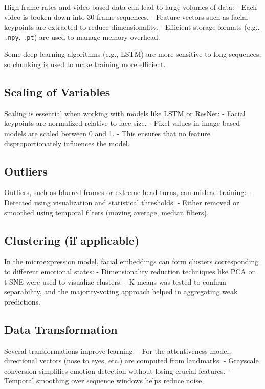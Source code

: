\documentclass[
  letterpaper,
  DIV=11,
  numbers=noendperiod]{scrreport}
\begin{document}
High frame rates and video-based data can lead to large volumes of data:
- Each video is broken down into 30-frame sequences. - Feature vectors
such as facial keypoints are extracted to reduce dimensionality. -
Efficient storage formats (e.g., \texttt{.npy}, \texttt{.pt}) are used
to manage memory overhead.

Some deep learning algorithms (e.g., LSTM) are more sensitive to long
sequences, so chunking is used to make training more efficient.

\subsection{Scaling of Variables}\label{scaling-of-variables}

Scaling is essential when working with models like LSTM or ResNet: -
Facial keypoints are normalized relative to face size. - Pixel values in
image-based models are scaled between 0 and 1. - This ensures that no
feature disproportionately influences the model.

\subsection{Outliers}\label{outliers}

Outliers, such as blurred frames or extreme head turns, can mislead
training: - Detected using visualization and statistical thresholds. -
Either removed or smoothed using temporal filters (moving average,
median filters).

\subsection{Clustering (if applicable)}\label{clustering-if-applicable}

In the microexpression model, facial embeddings can form clusters
corresponding to different emotional states: - Dimensionality reduction
techniques like PCA or t-SNE were used to visualize clusters. - K-means
was tested to confirm separability, and the majority-voting approach
helped in aggregating weak predictions.

\subsection{Data Transformation}\label{data-transformation}

Several transformations improve learning: - For the attentiveness model,
directional vectors (nose to eyes, etc.) are computed from landmarks. -
Grayscale conversion simplifies emotion detection without losing crucial
features. - Temporal smoothing over sequence windows helps reduce noise.
\end{document}
